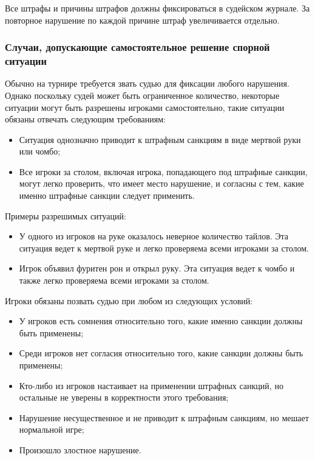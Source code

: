 Все штрафы и причины штрафов должны фиксироваться в судейском журнале. За повторное нарушение по каждой причине штраф увеличивается отдельно.

\subsubsection{Случаи, допускающие самостоятельное решение спорной ситуации}

Обычно на турнире требуется звать судью для фиксации любого нарушения. Однако поскольку судей может быть ограниченное количество, некоторые ситуации могут быть разрешены игроками самостоятельно, такие ситуации обязаны отвечать следующим требованиям:
\begin{itemize}
	\item Ситуация однозначно приводит к штрафным санкциям в виде мертвой руки или чомбо;
	\item Все игроки за столом, включая игрока, попадающего под штрафные санкции, могут легко проверить, что имеет место нарушение, и согласны с тем, какие именно штрафные санкции следует применить.
\end{itemize}

Примеры разрешимых ситуаций:
\begin{itemize}
	\item У одного из игроков на руке оказалось неверное количество тайлов. Эта ситуация ведет к мертвой руке и легко проверяема всеми игроками за столом.
	\item Игрок объявил фуритен рон и открыл руку. Эта ситуация ведет к чомбо и также легко проверяема всеми игроками за столом.
\end{itemize}

Игроки обязаны позвать судью при любом из следующих условий:
\begin{itemize}
	\item У игроков есть сомнения относительно того, какие именно санкции должны быть применены;
	\item Среди игроков нет согласия относительно того, какие санкции должны быть применены;
	\item Кто-либо из игроков настаивает на применении штрафных санкций, но остальные не уверены в корректности этого требования;
	\item Нарушение несущественное и не приводит к штрафным санкциям, но мешает нормальной игре;
	\item Произошло злостное нарушение.
\end{itemize}

